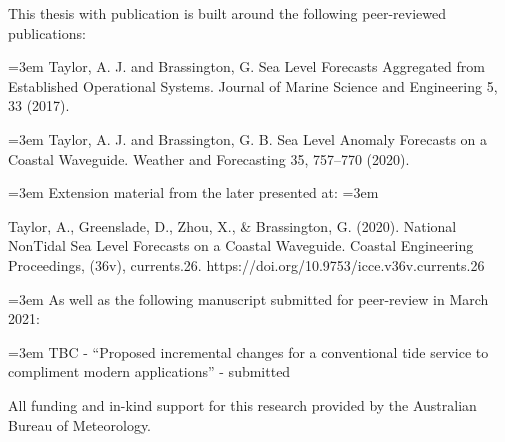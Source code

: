 
\begin{preface}

This thesis with publication is built around the following peer-reviewed publications:

\vspace{5mm}
\hangindent=3em
Taylor, A. J. and Brassington, G. Sea Level Forecasts Aggregated from Established Operational Systems. Journal of Marine Science and Engineering 5, 33 (2017).



\vspace{5mm}
\hangindent=3em
Taylor, A. J. and Brassington, G. B. Sea Level Anomaly Forecasts on a Coastal Waveguide. Weather and Forecasting 35, 757–770 (2020).

\vspace{5mm}
\hangindent=3em
Extension material from the later presented at:
\vspace{5mm}
\hangindent=3em

Taylor, A., Greenslade, D., Zhou, X., & Brassington, G. (2020). National NonTidal Sea Level Forecasts on a Coastal Waveguide. Coastal Engineering Proceedings, (36v), currents.26. https://doi.org/10.9753/icce.v36v.currents.26

\vspace{5mm}
\hangindent=3em
As well as the following manuscript submitted for peer-review in March 2021:

\vspace{5mm}
\hangindent=3em
TBC - ``Proposed incremental changes for a conventional tide service to compliment modern applications''  - submitted


\vspace{5mm}
\noindent  All funding and in-kind support for this research provided by the Australian Bureau of Meteorology. 

\end{preface}

